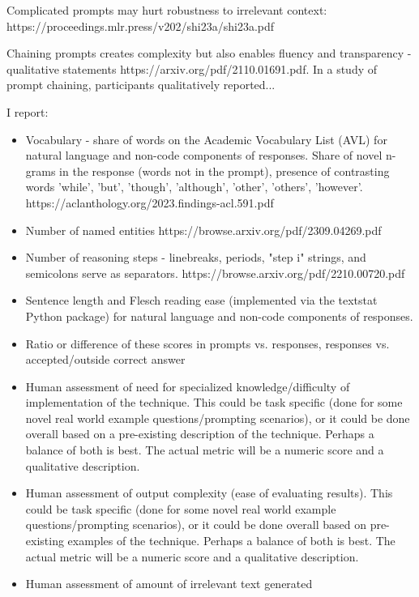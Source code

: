 \documentclass[11pt]{article}
\begin{document}
Complicated prompts may hurt robustness to irrelevant context: https://proceedings.mlr.press/v202/shi23a/shi23a.pdf

Chaining prompts creates complexity but also enables fluency and transparency - qualitative statements https://arxiv.org/pdf/2110.01691.pdf. In a study of prompt chaining, participants qualitatively reported...

I report:

\begin{itemize}
  \item Vocabulary - share of words on the Academic Vocabulary List (AVL) for natural language and non-code components of responses. \cite{gardner_new_2014} Share of novel n-grams in the response (words not in the prompt), presence of contrasting words {'while', 'but', 'though', 'although', 'other', 'others', 'however'}. https://aclanthology.org/2023.findings-acl.591.pdf
  \item Number of named entities https://browse.arxiv.org/pdf/2309.04269.pdf
  \item Number of reasoning steps - linebreaks, periods, "step i" strings, and semicolons serve as separators. https://browse.arxiv.org/pdf/2210.00720.pdf
  \item Sentence length and Flesch reading ease (implemented via the textstat Python package) for natural language and non-code components of responses. \cite{flesch_how_2016, aggarwal_textstat_nodate}
  \item Ratio or difference of these scores in prompts vs. responses, responses vs. accepted/outside correct answer
  \item Human assessment of need for specialized knowledge/difficulty of implementation of the technique. This could be task specific (done for some novel real world example questions/prompting scenarios), or it could be done overall based on a pre-existing description of the technique. Perhaps a balance of both is best. The actual metric will be a numeric score and a qualitative description.
  \item Human assessment of output complexity (ease of evaluating results). This could be task specific (done for some novel real world example questions/prompting scenarios), or it could be done overall based on pre-existing examples of the technique. Perhaps a balance of both is best. The actual metric will be a numeric score and a qualitative description.
  \item Human assessment of amount of irrelevant text generated
\end{itemize}
\end{document}
